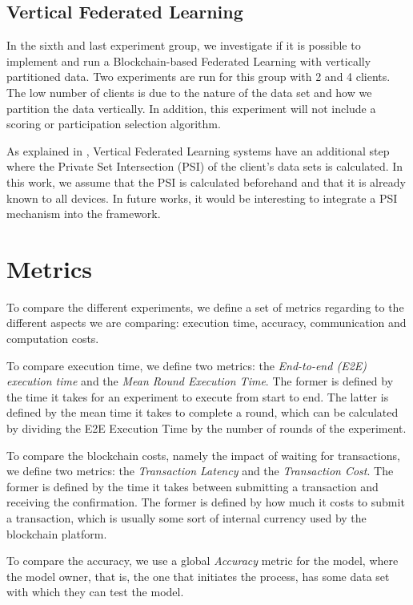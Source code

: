 \subsection{Vertical Federated Learning}

In the sixth and last experiment group, we investigate if it is possible to implement and run a Blockchain-based Federated Learning with vertically partitioned data. Two experiments are run for this group with 2 and 4 clients. The low number of clients is due to the nature of the data set and how we partition the data vertically. In addition, this experiment will not include a scoring or participation selection algorithm.

As explained in , Vertical Federated Learning systems have an additional step where the Private Set Intersection (PSI) of the client's data sets is calculated. In this work, we assume that the PSI is calculated beforehand and that it is already known to all devices. In future works, it would be interesting to integrate a PSI mechanism into the framework.

\section{Metrics}\label{meth:metrics}

To compare the different experiments, we define a set of metrics regarding to the different aspects we are comparing: execution time, accuracy, communication and computation costs.

To compare execution time, we define two metrics: the \textit{End-to-end (E2E) execution time} and the \textit{Mean Round Execution Time}. The former is defined by the time it takes for an experiment to execute from start to end. The latter is defined by the mean time it takes to complete a round, which can be calculated by dividing the E2E Execution Time by the number of rounds of the experiment.

To compare the blockchain costs, namely the impact of waiting for transactions, we define two metrics: the \textit{Transaction Latency} and the \textit{Transaction Cost}. The former is defined by the time it takes between submitting a transaction and receiving the confirmation. The former is defined by how much it costs to submit a transaction, which is usually some sort of internal currency used by the blockchain platform.

To compare the accuracy, we use a global \textit{Accuracy} metric for the model, where the model owner, that is, the one that initiates the process, has some data set with which they can test the model.

